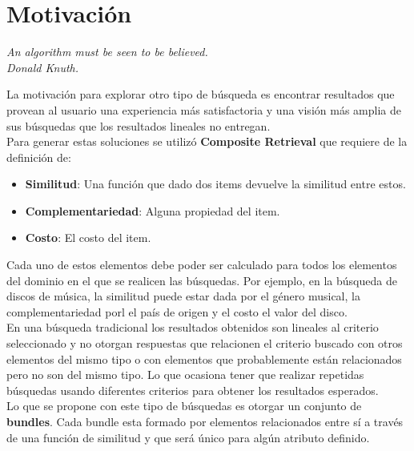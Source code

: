 \section{Motivación}
{\begin{small}%
\begin{flushright}%
\it An algorithm must be seen to be believed.\\Donald Knuth.
\end{flushright}%
\end{small}%
\vspace{.5cm}}
La motivación para explorar otro tipo de búsqueda es encontrar resultados que provean al 
usuario una experiencia más satisfactoria y una visión más amplia de sus búsquedas que los 
resultados lineales no entregan.\\
Para generar estas soluciones se utilizó \textbf{Composite Retrieval} que requiere de la definición de: 
\begin{itemize}
  \item \textbf{Similitud}: Una función que dado dos items devuelve la similitud entre estos.
  \item \textbf{Complementariedad}: Alguna propiedad del item.
  \item \textbf{Costo}: El costo del item. 
\end{itemize}
Cada uno de estos elementos debe poder ser calculado para todos los elementos del dominio en el que 
se realicen las búsquedas. Por ejemplo, en la búsqueda de discos de música, la similitud puede estar 
dada por el género musical, la complementariedad porl el país de origen y el costo el valor del disco.\\
En una búsqueda tradicional los resultados obtenidos son lineales al criterio seleccionado y no 
otorgan respuestas que relacionen el criterio buscado con otros elementos del mismo tipo o 
con elementos que probablemente están relacionados pero no son del mismo tipo. Lo que ocasiona 
tener que realizar repetidas búsquedas usando diferentes criterios para obtener los resultados 
esperados.\\
Lo que se propone con este tipo de búsquedas es otorgar un conjunto de \textbf{bundles}. Cada 
bundle esta formado por elementos relacionados entre sí a través de una función de similitud y que 
será único para algún atributo definido.
